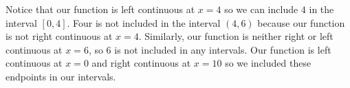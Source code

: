 \documentclass{ximera}
\begin{document}
\begin{question}
\begin{multipleChoice}
  \choice[correct]{$[0,4]$, $(4,6)$, and $(6,10]$}
  \choice{$[0,4)$, $(4,6)$, and $(6,10]$}
  \choice{$(0,4]$, $[4,6]$, and $[6,10)$}
\end{multipleChoice}
\begin{feedback}
Notice that our function is left continuous at $x=4$ so we can include
$4$ in the interval $[0,4]$. Four is not included in the interval
$(4,6)$ because our function is not right continuous at $x=4$.
Similarly, our function is neither right or left continuous at $x=6$,
so $6$ is not included in any intervals.  Our function is left
continuous at $x=0$ and right continuous at $x=10$ so we included
these endpoints in our intervals.
\end{feedback}
\end{question}
\end{document}
